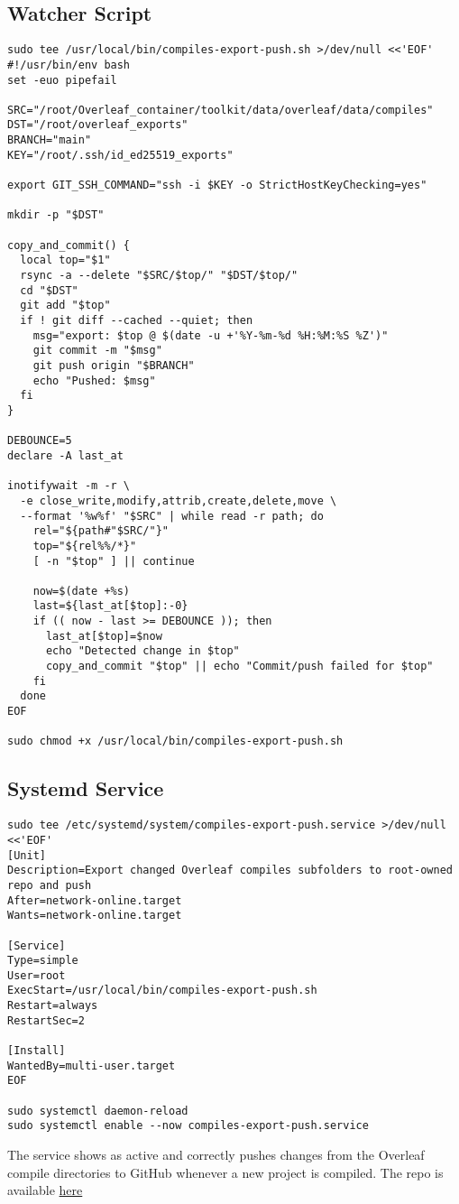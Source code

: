\subsection*{Watcher Script}

\begin{verbatim}
sudo tee /usr/local/bin/compiles-export-push.sh >/dev/null <<'EOF'
#!/usr/bin/env bash
set -euo pipefail

SRC="/root/Overleaf_container/toolkit/data/overleaf/data/compiles"
DST="/root/overleaf_exports"
BRANCH="main"
KEY="/root/.ssh/id_ed25519_exports"

export GIT_SSH_COMMAND="ssh -i $KEY -o StrictHostKeyChecking=yes"

mkdir -p "$DST"

copy_and_commit() {
  local top="$1"
  rsync -a --delete "$SRC/$top/" "$DST/$top/"
  cd "$DST"
  git add "$top"
  if ! git diff --cached --quiet; then
    msg="export: $top @ $(date -u +'%Y-%m-%d %H:%M:%S %Z')"
    git commit -m "$msg"
    git push origin "$BRANCH"
    echo "Pushed: $msg"
  fi
}

DEBOUNCE=5
declare -A last_at

inotifywait -m -r \
  -e close_write,modify,attrib,create,delete,move \
  --format '%w%f' "$SRC" | while read -r path; do
    rel="${path#"$SRC/"}"
    top="${rel%%/*}"
    [ -n "$top" ] || continue

    now=$(date +%s)
    last=${last_at[$top]:-0}
    if (( now - last >= DEBOUNCE )); then
      last_at[$top]=$now
      echo "Detected change in $top"
      copy_and_commit "$top" || echo "Commit/push failed for $top"
    fi
  done
EOF

sudo chmod +x /usr/local/bin/compiles-export-push.sh
\end{verbatim}

\subsection*{Systemd Service}

\begin{verbatim}
sudo tee /etc/systemd/system/compiles-export-push.service >/dev/null <<'EOF'
[Unit]
Description=Export changed Overleaf compiles subfolders to root-owned repo and push
After=network-online.target
Wants=network-online.target

[Service]
Type=simple
User=root
ExecStart=/usr/local/bin/compiles-export-push.sh
Restart=always
RestartSec=2

[Install]
WantedBy=multi-user.target
EOF

sudo systemctl daemon-reload
sudo systemctl enable --now compiles-export-push.service
\end{verbatim}

The service shows as active and correctly pushes changes from the Overleaf compile directories to GitHub whenever a new project is compiled. The repo is available \hyperref[https://github.com/IvanFarfan08/Overleaf_Files_SSW590F]{here}